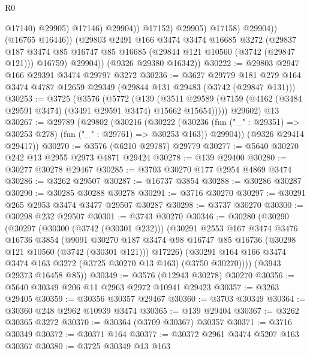 \begin{lexlean}{R0}
\begin{coremodule}
                              @17140)
                            @29905)
                          @17146)
                        @29904))
                    @17152)
                  @29905)
                @17158)
              @29904))
          (@16765 @16446))
        (@29803
          @2491
          @166
          @3474
          @3474
          @16685
          @3272
          (@29837
            @187
            @3474
            @85
            @16747
            @85
            @16685
            (@29844 @121 @10560 (@3742 (@29847 @121)))
            @16759)
          @29904))
      (@9326 @29380 @16342))
@30222 := @29803 @2947 @166 @29391 @3474 @29797 @3272
@30236 := @3627
    @29779
    @181
    @279
    @164
    @3474
    @4787
    @12659
    @29349
    (@29844 @131 @29483 (@3742 (@29847 @131)))
@30253 := @3725
    (@3576
      (@5772
        (@139
          (@3511 @29589 (@7159 (@4162 (@3484 @29591 @3474) (@3491 @29591 @3474) @15662 @15654)))))
      @29602)
    @13
@30267 := @29789
    (@29802
      (@30216
        (@30222
          (@30236 (fun ("_" : @29351) => @30253 @278) (fun ("_" : @29761) => @30253 @163))
          @29904))
      (@9326 @29414 @29417))
@30270 := @3576 (@6210 @29787) @29779
@30277 := @5640 @30270 @242 @13 @2955 @2973 @4871 @29424
@30278 := @139 @29400
@30280 := @30277 @30278 @29467
@30285 := @3703 @30270 @177 @2954 @4869 @3474
@30286 := @3262 @29507
@30287 := @16737 @3854
@30288 := @30286 @30287
@30290 := @30285 @30288 @30278
@30291 := @3716 @30270
@30297 := @30291 @265 @2953 @3474 @3477 @29507 @30287
@30298 := @3737 @30270
@30300 := @30298 @232 @29507
@30301 := @3743 @30270
@30346 := @30280
    (@30290
      (@30297
        (@30300 (@3742 (@30301 @232)))
        (@30291
          @2553
          @167
          @3474
          @3476
          @16736
          @3854
          (@9091
            @30270
            @187
            @3474
            @98
            @16747
            @85
            @16736
            (@30298 @121 @10560 (@3742 (@30301 @121)))
            @17226)
          (@30291 @164 @166 @3474 @3474 @163 @3272 (@3725 @30270 @13 @163) (@3750 @30270))))
      (@3943 @29373 @16458 @85))
@30349 := @3576 (@12943 @30278) @30270
@30356 := @5640 @30349 @206 @11 @2963 @2972 @10941 @29423
@30357 := @3263 @29405
@30359 := @30356 @30357 @29467
@30360 := @3703 @30349
@30364 := @30360 @248 @2962 @10939 @3474
@30365 := @139 @29404
@30367 := @3262 @30365 @3272
@30370 := @30364 (@3709 @30367) @30357
@30371 := @3716 @30349
@30372 := @30371 @164
@30377 := @30372 @2961 @3474 @5207 @163 @30367
@30380 := @3725 @30349 @13 @163

\end{coremodule}
\end{lexlean}
